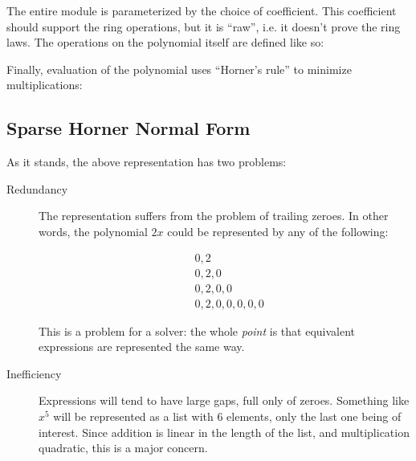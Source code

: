 \documentclass[draft, twocolumn]{article}
\theoremstyle{definition}
\theoremstyle{remark}
\begin{document}
The entire module is parameterized by the choice of coefficient. This
coefficient should support the ring operations, but it is ``raw'', i.e. it
doesn't prove the ring laws. The operations on the polynomial itself are defined
like so\footnotemark:

Finally, evaluation of the polynomial uses ``Horner's rule'' to minimize
multiplications:
\subsection{Sparse Horner Normal Form}
As it stands, the above representation has two problems:

\begin{description}
  \item[Redundancy] The representation suffers from the problem of trailing
    zeroes. In other words, the polynomial $2x$ could be represented by any of
    the following:
  
    \begin{align*}
      & 0, 2 \\
      & 0, 2, 0 \\
      & 0, 2, 0, 0 \\
      & 0, 2, 0, 0, 0, 0, 0
    \end{align*}
    
    This is a problem for a solver: the whole \emph{point} is that equivalent
    expressions are represented the same way.

  \item[Inefficiency] Expressions will tend to have large gaps, full only of
    zeroes. Something like $x^5$ will be represented as a list with 6 elements,
    only the last one being of interest. Since addition is linear in the length
    of the list, and multiplication quadratic, this is a major concern.
\end{description}
\end{document}
